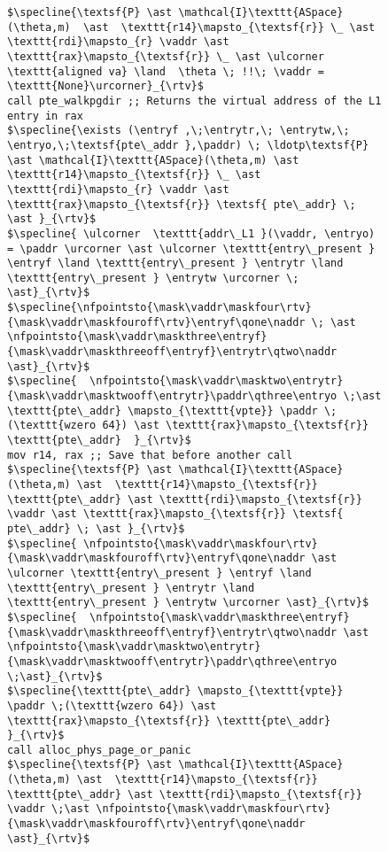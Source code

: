 \begin{figure}\footnotesize
  \begin{lstlisting}[mathescape]
$\specline{\textsf{P} \ast \mathcal{I}\texttt{ASpace}(\theta,m)  \ast  \texttt{r14}\mapsto_{\textsf{r}} \_ \ast \texttt{rdi}\mapsto_{r} \vaddr \ast \texttt{rax}\mapsto_{\textsf{r}} \_ \ast \ulcorner \texttt{aligned va} \land  \theta \; !!\; \vaddr = \texttt{None}\urcorner}_{\rtv}$
call pte_walkpgdir ;; Returns the virtual address of the L1 entry in rax
$\specline{\exists (\entryf ,\;\entrytr,\; \entrytw,\; \entryo,\;\textsf{pte\_addr },\paddr) \; \ldotp\textsf{P} \ast \mathcal{I}\texttt{ASpace}(\theta,m) \ast  \texttt{r14}\mapsto_{\textsf{r}} \_ \ast \texttt{rdi}\mapsto_{r} \vaddr \ast \texttt{rax}\mapsto_{\textsf{r}} \textsf{ pte\_addr} \; \ast }_{\rtv}$
$\specline{ \ulcorner  \texttt{addr\_L1 }(\vaddr, \entryo) = \paddr \urcorner \ast \ulcorner \texttt{entry\_present } \entryf \land \texttt{entry\_present } \entrytr \land  \texttt{entry\_present } \entrytw \urcorner \; \ast}_{\rtv}$
$\specline{\nfpointsto{\mask\vaddr\maskfour\rtv}{\mask\vaddr\maskfouroff\rtv}\entryf\qone\naddr \; \ast \nfpointsto{\mask\vaddr\maskthree\entryf}{\mask\vaddr\maskthreeoff\entryf}\entrytr\qtwo\naddr \ast}_{\rtv}$ 
$\specline{  \nfpointsto{\mask\vaddr\masktwo\entrytr}{\mask\vaddr\masktwooff\entrytr}\paddr\qthree\entryo \;\ast \texttt{pte\_addr} \mapsto_{\texttt{vpte}} \paddr \;(\texttt{wzero 64}) \ast \texttt{rax}\mapsto_{\textsf{r}} \texttt{pte\_addr}  }_{\rtv}$
mov r14, rax ;; Save that before another call
$\specline{\textsf{P} \ast \mathcal{I}\texttt{ASpace}(\theta,m) \ast  \texttt{r14}\mapsto_{\textsf{r}} \texttt{pte\_addr} \ast \texttt{rdi}\mapsto_{\textsf{r}} \vaddr \ast \texttt{rax}\mapsto_{\textsf{r}} \textsf{ pte\_addr} \; \ast }_{\rtv}$
$\specline{ \nfpointsto{\mask\vaddr\maskfour\rtv}{\mask\vaddr\maskfouroff\rtv}\entryf\qone\naddr \ast \ulcorner \texttt{entry\_present } \entryf \land \texttt{entry\_present } \entrytr \land  \texttt{entry\_present } \entrytw \urcorner \ast}_{\rtv}$ 
$\specline{  \nfpointsto{\mask\vaddr\maskthree\entryf}{\mask\vaddr\maskthreeoff\entryf}\entrytr\qtwo\naddr \ast \nfpointsto{\mask\vaddr\masktwo\entrytr}{\mask\vaddr\masktwooff\entrytr}\paddr\qthree\entryo \;\ast}_{\rtv}$
$\specline{\texttt{pte\_addr} \mapsto_{\texttt{vpte}} \paddr \;(\texttt{wzero 64}) \ast \texttt{rax}\mapsto_{\textsf{r}} \texttt{pte\_addr}  }_{\rtv}$
call alloc_phys_page_or_panic
$\specline{\textsf{P} \ast \mathcal{I}\texttt{ASpace}(\theta,m) \ast  \texttt{r14}\mapsto_{\textsf{r}} \texttt{pte\_addr} \ast \texttt{rdi}\mapsto_{\textsf{r}} \vaddr \;\ast \nfpointsto{\mask\vaddr\maskfour\rtv}{\mask\vaddr\maskfouroff\rtv}\entryf\qone\naddr \ast}_{\rtv}$ 

\end{lstlisting}
\end{figure}
